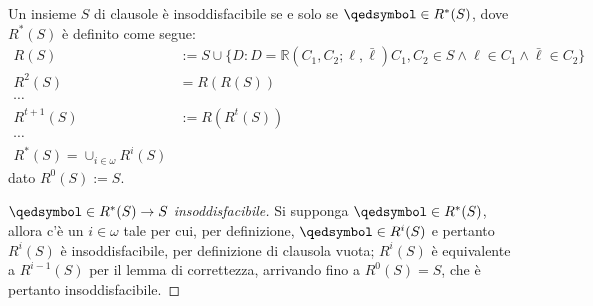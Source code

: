 \begin{teo}
       Un insieme $S$ di clausole è insoddisfacibile se e solo se 
       $\qedsymbol \in R^*(S)$, dove $R^*(S)$ è definito come segue: 
       \begin{align*}
               R(S) &:= S \cup \{D: D = \mathbb{R}(C_1, C_2; \ell, \bar{\ell}) C_1, C_2 \in S \land \ell \in C_1 \land \bar{\ell} \in C_2\} \\
               R^2(S) &= R(R(S)) \\
               \cdots \\
               R^{t+1}(S) &:= R(R^{t}(S)) \\
               \cdots \\
               R^*(S) = \cup_{i \in \omega} R^i(S)
       \end{align*}
       dato $R^0(S) := S$. 
\end{teo}
\begin{proof}[$\qedsymbol \in R^*(S) \rightarrow S$ insoddisfacibile]
        Si supponga $\qedsymbol \in R^*(S)$, allora c'è un $i \in \omega$ tale 
        per cui, per definizione, $\qedsymbol \in R^i(S)$ e pertanto 
        $R^i(S)$ è insoddisfacibile, per definizione di clausola vuota; 
        $R^i(S)$ è equivalente a $R^{i-1}(S)$ per il lemma di correttezza, 
        arrivando fino a $R^0(S) = S$, che è pertanto insoddisfacibile.
\end{proof}
